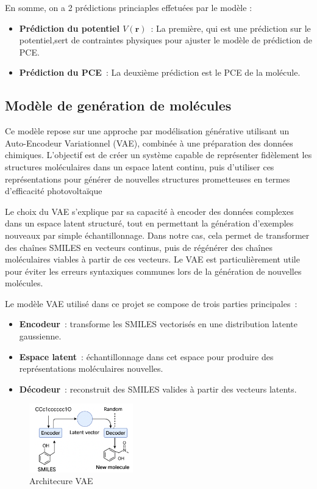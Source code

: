 En somme, on a 2 prédictions princiaples effetuées par le modèle :
\begin{itemize}
    \item \textbf{Prédiction du potentiel $V(\mathbf{r})$} : La première, qui est une prédiction sur le potentiel,sert de contraintes physiques pour ajuster le modèle de prédiction de PCE.
    \item \textbf{Prédiction du PCE} : La deuxième prédiction est le PCE de la molécule.
\end{itemize}

\subsection{Modèle de genération de molécules}
Ce modèle repose sur une approche par modélisation générative utilisant
un Auto-Encodeur Variationnel (VAE), combinée à une préparation des
données chimiques. L'objectif est de créer un système capable de représenter
fidèlement les structures moléculaires dans un espace latent continu, puis d'utiliser
ces représentations pour générer de nouvelles structures prometteuses en termes
d'efficacité photovoltaïque

Le choix du VAE s'explique par sa capacité à encoder des données complexes dans
un espace latent structuré, tout en permettant la génération d'exemples nouveaux
par simple échantillonnage. Dans notre cas, cela permet de transformer des chaînes
SMILES en vecteurs continus, puis de régénérer des chaînes moléculaires viables à
partir de ces vecteurs. Le VAE est particulièrement utile pour éviter les erreurs
syntaxiques communes lors de la génération de nouvelles molécules.

Le modèle VAE utilisé dans ce projet se compose de trois parties principales :

\begin{itemize}
    \item \textbf{Encodeur} : transforme les SMILES vectorisés en une distribution latente gaussienne.
    \item \textbf{Espace latent} : échantillonnage dans cet espace pour produire des représentations moléculaires nouvelles.
    \item \textbf{Décodeur} : reconstruit des SMILES valides à partir des vecteurs latents.
\end{itemize}


\begin{figure}[H]
    \centering
    \includegraphics[width=0.4\textwidth]{Architecture/vae.png}
    \caption{Architecure VAE}
\end{figure}

